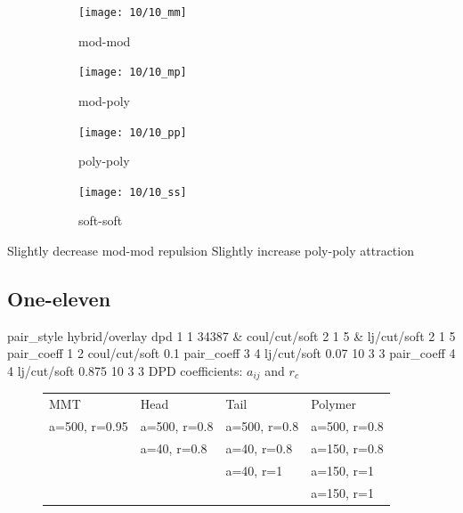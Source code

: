 \documentclass[a4paper]{article}
\begin{document}
\begin{figure}[H]
\begin{subfigure}{0.24\textwidth}
  \centering
  \texttt{[image: 10/10\_mm]}
  \caption{mod-mod}
\end{subfigure}
\begin{subfigure}{0.24\textwidth}
  \centering
  \texttt{[image: 10/10\_mp]}
  \caption{mod-poly}
\end{subfigure}
\begin{subfigure}{0.24\textwidth}
  \centering
  \texttt{[image: 10/10\_pp]}
  \caption{poly-poly}
\end{subfigure}
\begin{subfigure}{0.24\textwidth}
  \centering
  \texttt{[image: 10/10\_ss]}
  \caption{soft-soft}
\end{subfigure}
\caption{}
\label{fig_1}
\end{figure}
Slightly decrease mod-mod repulsion\newline
Slightly increase poly-poly attraction



\subsection*{One-eleven}
pair\_style hybrid/overlay dpd 1 1 34387 \& coul/cut/soft 2 1 5 \& 
lj/cut/soft 2 1 5\newline
pair\_coeff 1 2 coul/cut/soft 0.1\newline
pair\_coeff 3 4 lj/cut/soft 0.07    10 3 3\newline
pair\_coeff 4 4 lj/cut/soft 0.875    10 3 3\newline
DPD coefficients: $a_{ij}$ and $r_c$
\begin{figure}[H]\begin{tabular}{llll}
MMT           & Head         & Tail         & Polymer      \\
a=500, r=0.95 & a=500, r=0.8 & a=500, r=0.8 & a=500, r=0.8 \\
              & a=40,  r=0.8 & a=40,  r=0.8 & a=150, r=0.8 \\
              &              & a=40,  r=1   & a=150, r=1   \\
              &              &              & a=150, r=1   \\
\end{tabular}\end{figure}
\end{document}
